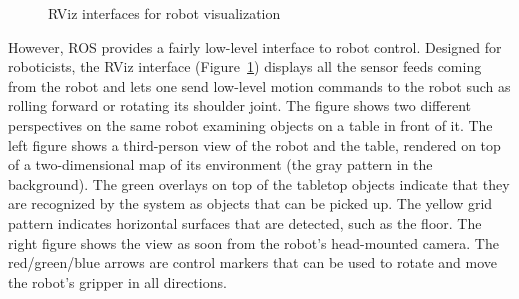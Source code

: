 \documentclass[10pt,twocolumn]{article}
\begin{document}
\begin{figure}[tbh]
\center{}
\caption{RViz interfaces for robot visualization}
\label{rviz}
\end{figure}

However, ROS provides a fairly low-level interface to robot control. Designed for roboticists, the RViz interface (Figure~\ref{rviz}) displays all the sensor feeds coming from the robot and lets one send low-level motion commands to the robot such as rolling forward or rotating its shoulder joint. The figure shows two different perspectives on the same robot examining objects on a table in front of it. The left figure shows a third-person view of the robot and the table, rendered on top of a two-dimensional map of its environment (the gray pattern in the background). The green overlays on top of the tabletop objects indicate that they are recognized by the system as objects that can be picked up. The yellow grid pattern indicates horizontal surfaces that are detected, such as the floor.  The right figure shows the view as soon from the robot's head-mounted camera. The red/green/blue arrows are control markers that can be used to rotate and move the robot's gripper in all directions.
\end{document}

